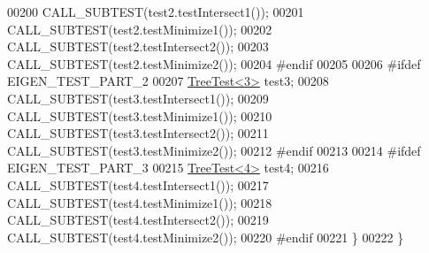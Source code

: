 \begin{DoxyCode}
00200     CALL\_SUBTEST(test2.testIntersect1());
00201     CALL\_SUBTEST(test2.testMinimize1());
00202     CALL\_SUBTEST(test2.testIntersect2());
00203     CALL\_SUBTEST(test2.testMinimize2());
00204 \textcolor{preprocessor}{#endif}
00205 
00206 \textcolor{preprocessor}{#ifdef EIGEN\_TEST\_PART\_2}
00207     \hyperlink{struct_tree_test}{TreeTest<3>} test3;
00208     CALL\_SUBTEST(test3.testIntersect1());
00209     CALL\_SUBTEST(test3.testMinimize1());
00210     CALL\_SUBTEST(test3.testIntersect2());
00211     CALL\_SUBTEST(test3.testMinimize2());
00212 \textcolor{preprocessor}{#endif}
00213 
00214 \textcolor{preprocessor}{#ifdef EIGEN\_TEST\_PART\_3}
00215     \hyperlink{struct_tree_test}{TreeTest<4>} test4;
00216     CALL\_SUBTEST(test4.testIntersect1());
00217     CALL\_SUBTEST(test4.testMinimize1());
00218     CALL\_SUBTEST(test4.testIntersect2());
00219     CALL\_SUBTEST(test4.testMinimize2());
00220 \textcolor{preprocessor}{#endif}
00221   \}
00222 \}
\end{DoxyCode}
